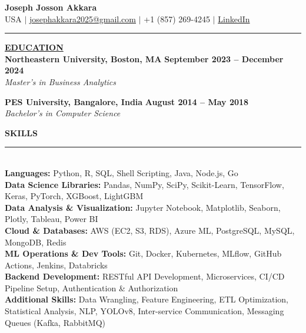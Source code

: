 \documentclass{article}
\begin{document}
\begin{center}
\thispagestyle{empty}

\large \textbf{Joseph Josson Akkara} \\
\normalsize USA $\mid$ \href{mailto:josephakkara2025@gmail.com}{josephakkara2025@gmail.com} $\mid$ +1 (857) 269-4245 $\mid$ \href{https://www.linkedin.com/in/josephjosson/}{LinkedIn} \\
\rule{\textwidth}{1pt}
\end{center}

\noindent \textbf{\underline{EDUCATION}} \\
\noindent \textbf{Northeastern University, Boston, MA} \hfill \textbf{September 2023 -- December 2024} \\
\textit{Master's in Business Analytics}

\vspace{3mm}

\noindent \textbf{PES University, Bangalore, India} \hfill \textbf{August 2014 -- May 2018} \\
\textit{Bachelor's in Computer Science}
\vspace{3mm}

\noindent \textbf{{SKILLS}} \vspace{-8pt} \\
\rule{\linewidth}{0.5pt} \\
\noindent \textbf{Languages:} Python, R, SQL, Shell Scripting, Java, Node.js, Go \\
\textbf{Data Science Libraries:} Pandas, NumPy, SciPy, Scikit-Learn, TensorFlow, Keras, PyTorch, XGBoost, LightGBM \\
\textbf{Data Analysis \& Visualization:} Jupyter Notebook, Matplotlib, Seaborn, Plotly, Tableau, Power BI \\
\textbf{Cloud \& Databases:} AWS (EC2, S3, RDS), Azure ML, PostgreSQL, MySQL, MongoDB, Redis \\
\textbf{ML Operations \& Dev Tools:} Git, Docker, Kubernetes, MLflow, GitHub Actions, Jenkins, Databricks \\
\textbf{Backend Development:} RESTful API Development, Microservices, CI/CD Pipeline Setup, Authentication \& Authorization \\
\textbf{Additional Skills:} Data Wrangling, Feature Engineering, ETL Optimization, Statistical Analysis, NLP, YOLOv8, Inter-service Communication, Messaging Queues (Kafka, RabbitMQ)
\vspace{3mm}
\end{document}
